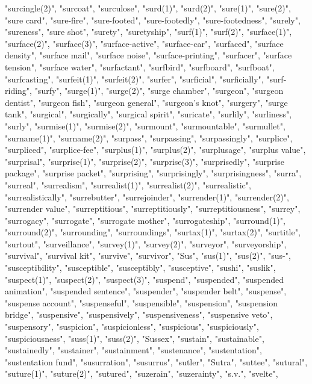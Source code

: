 "surcingle(2)",
"surcoat",
"surculose",
"surd(1)",
"surd(2)",
"sure(1)",
"sure(2)",
"sure card",
"sure-fire",
"sure-footed",
"sure-footedly",
"sure-footedness",
"surely",
"sureness",
"sure shot",
"surety",
"suretyship",
"surf(1)",
"surf(2)",
"surface(1)",
"surface(2)",
"surface(3)",
"surface-active",
"surface-car",
"surfaced",
"surface density",
"surface mail",
"surface noise",
"surface-printing",
"surfacer",
"surface tension",
"surface water",
"surfactant",
"surfbird",
"surfboard",
"surfboat",
"surfcasting",
"surfeit(1)",
"surfeit(2)",
"surfer",
"surficial",
"surficially",
"surf-riding",
"surfy",
"surge(1)",
"surge(2)",
"surge chamber",
"surgeon",
"surgeon dentist",
"surgeon fish",
"surgeon general",
"surgeon's knot",
"surgery",
"surge tank",
"surgical",
"surgically",
"surgical spirit",
"suricate",
"surlily",
"surliness",
"surly",
"surmise(1)",
"surmise(2)",
"surmount",
"surmountable",
"surmullet",
"surname(1)",
"surname(2)",
"surpass",
"surpassing",
"surpassingly",
"surplice",
"surpliced",
"surplice-fee",
"surplus(1)",
"surplus(2)",
"surplusage",
"surplus value",
"surprisal",
"surprise(1)",
"surprise(2)",
"surprise(3)",
"surprisedly",
"surprise package",
"surprise packet",
"surprising",
"surprisingly",
"surprisingness",
"surra",
"surreal",
"surrealism",
"surrealist(1)",
"surrealist(2)",
"surrealistic",
"surrealistically",
"surrebutter",
"surrejoinder",
"surrender(1)",
"surrender(2)",
"surrender value",
"surreptitious",
"surreptitiously",
"surreptitiousness",
"surrey",
"surrogacy",
"surrogate",
"surrogate mother",
"surrogateship",
"surround(1)",
"surround(2)",
"surrounding",
"surroundings",
"surtax(1)",
"surtax(2)",
"surtitle",
"surtout",
"surveillance",
"survey(1)",
"survey(2)",
"surveyor",
"surveyorship",
"survival",
"survival kit",
"survive",
"survivor",
"Sus",
"sus(1)",
"sus(2)",
"sus-",
"susceptibility",
"susceptible",
"susceptibly",
"susceptive",
"sushi",
"suslik",
"suspect(1)",
"suspect(2)",
"suspect(3)",
"suspend",
"suspended",
"suspended animation",
"suspended sentence",
"suspender",
"suspender belt",
"suspense",
"suspense account",
"suspenseful",
"suspensible",
"suspension",
"suspension bridge",
"suspensive",
"suspensively",
"suspensiveness",
"suspensive veto",
"suspensory",
"suspicion",
"suspicionless",
"suspicious",
"suspiciously",
"suspiciousness",
"suss(1)",
"suss(2)",
"Sussex",
"sustain",
"sustainable",
"sustainedly",
"sustainer",
"sustainment",
"sustenance",
"sustentation",
"sustentation fund",
"susurration",
"susurrus",
"sutler",
"Sutra",
"suttee",
"sutural",
"suture(1)",
"suture(2)",
"sutured",
"suzerain",
"suzerainty",
"s.v.",
"svelte",

